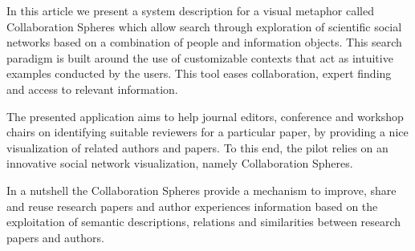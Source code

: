 In this article we present a system description for a visual metaphor called Collaboration Spheres which allow search through exploration of scientific social networks based on a combination of people and information objects. This search paradigm is built around the use of customizable contexts that act as intuitive examples conducted by the users. This tool eases collaboration, expert finding and access to relevant information.

The presented application aims to help journal editors, conference and workshop chairs on identifying suitable reviewers for a particular paper, by providing a nice visualization of related authors and papers. To this end, the pilot relies on an innovative social network visualization, namely Collaboration Spheres. 

In a nutshell the Collaboration Spheres provide a mechanism to improve, share and reuse research papers and author experiences information based on the exploitation of semantic descriptions, relations and similarities between research papers and authors.
